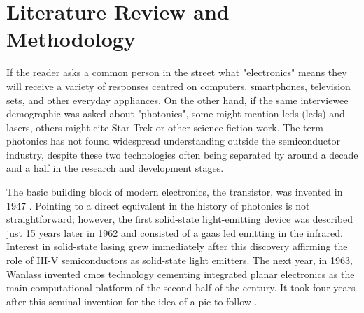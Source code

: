 \chapter{Literature Review and Methodology}
\label{chap:review}

If the reader asks a common person in the street what "electronics" means they will receive a variety of responses centred on computers, smartphones, television sets, and other everyday appliances. On the other hand, if the same interviewee demographic was asked about "photonics", some might mention \acl{led}s (\acs{led}s) and lasers, others might cite Star Trek or other science-fiction work. The term photonics has not found widespread understanding outside the semiconductor industry, despite these two technologies often being separated by around a decade and a half in the research and development stages. 

The basic building block of modern electronics, the transistor, was invented in 1947 \cite{Bardeen1948, Bardeen1950}. Pointing to a direct equivalent in the history of photonics is not straightforward; however, the first solid-state light-emitting device was described just \num{15} years later in 1962 \cite{Biard1966} and consisted of a \acf{gaas} \acs{led} emitting in the infrared. Interest in solid-state lasing grew immediately after this discovery \cite{Hall1962, Hall1963} affirming the role of III-V semiconductors as solid-state light emitters. The next year, in 1963, Wanlass invented \acf{cmos} technology \cite{Wanlass1967} cementing integrated planar electronics as the main computational platform of the second half of the century. It took four years after this seminal invention for the idea of a \acf{pic} to follow \cite{Miller1969}.

